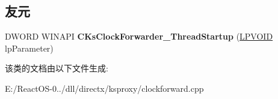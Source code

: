 \subsection*{友元}
\begin{DoxyCompactItemize}
\item 
\mbox{\label{class_c_ks_clock_forwarder_ac50c294d869c2da22e18f378885173c3}} 
D\+W\+O\+RD W\+I\+N\+A\+PI {\bfseries C\+Ks\+Clock\+Forwarder\+\_\+\+Thread\+Startup} (\hyperlink{interfacevoid}{L\+P\+V\+O\+ID} lp\+Parameter)
\end{DoxyCompactItemize}


该类的文档由以下文件生成\+:\begin{DoxyCompactItemize}
\item 
E\+:/\+React\+O\+S-\/0../dll/directx/ksproxy/clockforward.\+cpp\end{DoxyCompactItemize}

